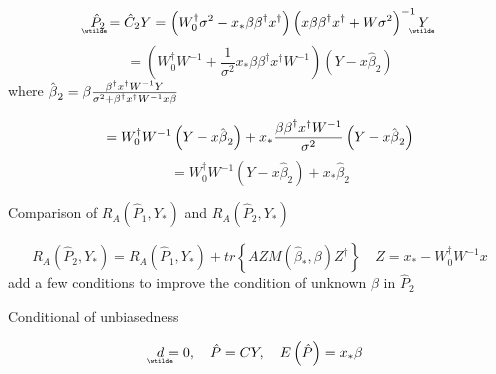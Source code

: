 \documentclass{article}
\begin{document}
\begin{equation*}
\therefore 
\underaccent{\wtilde}{\hat{P}}%
_{2}=\hat{C}_{2}Y=\left( W_{0}^{\dagger }\sigma ^{2}-x_{\ast }\beta \beta
^{\dagger }x^{\dagger }\right) \left( x\beta \beta ^{\dagger }x^{\dagger
}+W\sigma ^{2}\right) ^{-1}%
\underaccent{\wtilde}{Y}%
\end{equation*}%
\begin{equation*}
=\left( W_{0}^{\dagger }W^{-1}+\frac{1}{\sigma ^{2}}x_{\ast }\beta \beta
^{\dagger }x^{\dagger }W^{-1}\right) \left( Y-x\hat{\beta}_{2}\right)
\end{equation*}%
where $\hat{\beta}_{2}=\beta \frac{\beta ^{\dagger }x^{\dagger }W^{-1}Y}{%
\sigma ^{2}+\beta ^{\dagger }x^{\dagger }W^{-1}x\beta }$

\begin{equation*}
=W_{0}^{\dagger }W^{-1}\left( Y-x\hat{\beta}_{2}\right) +x_{\ast }\frac{%
\beta \beta ^{\dagger }x^{\dagger }W^{-1}}{\sigma ^{2}}\left( Y-x\hat{\beta}%
_{2}\right)
\end{equation*}%
\begin{equation*}
=W_{0}^{\dagger }W^{-1}\left( Y-x\hat{\beta}_{2}\right) +x_{\ast }\hat{\beta}%
_{2}
\end{equation*}

\bigskip

Comparison of $R_{A}\left( \hat{P}_{1},Y_{\ast }\right) $ and $R_{A}\left( 
\hat{P}_{2},Y_{\ast }\right) $

\begin{equation*}
R_{A}\left( \hat{P}_{2},Y_{\ast }\right) =R_{A}\left( \hat{P}_{1},Y_{\ast
}\right) +tr\left\{ AZM\left( \hat{\beta}_{\ast },\beta \right) Z^{\dagger
}\right\} \quad Z=x_{\ast }-W_{0}^{\dagger }W^{-1}x
\end{equation*}%
add a few conditions to improve the condition of unknown $\beta $ in $\hat{P}%
_{2}$

\bigskip

Conditional of unbiasedness

\begin{equation*}
\underaccent{\wtilde}{d}%
=0,\quad \hat{P}=CY,\quad E\left( \hat{P}\right) =x_{\ast }\beta
\end{equation*}
\end{document}
